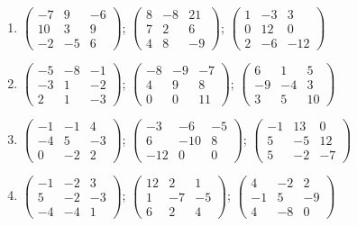 \begin{enumerate}[label=\arabic*., leftmargin=*, itemsep=1pt]
\item $\left(\begin{smallmatrix}-7 & 9 & -6\\ 10 & 3 & 9\\ -2 & -5 & 6\end{smallmatrix}\right)$; $\left(\begin{smallmatrix}8 & -8 & 21\\ 7 & 2 & 6\\ 4 & 8 & -9\end{smallmatrix}\right)$; $\left(\begin{smallmatrix}1 & -3 & 3\\ 0 & 12 & 0\\ 2 & -6 & -12\end{smallmatrix}\right)$
\item $\left(\begin{smallmatrix}-5 & -8 & -1\\ -3 & 1 & -2\\ 2 & 1 & -3\end{smallmatrix}\right)$; $\left(\begin{smallmatrix}-8 & -9 & -7\\ 4 & 9 & 8\\ 0 & 0 & 11\end{smallmatrix}\right)$; $\left(\begin{smallmatrix}6 & 1 & 5\\ -9 & -4 & 3\\ 3 & 5 & 10\end{smallmatrix}\right)$
\item $\left(\begin{smallmatrix}-1 & -1 & 4\\ -4 & 5 & -3\\ 0 & -2 & 2\end{smallmatrix}\right)$; $\left(\begin{smallmatrix}-3 & -6 & -5\\ 6 & -10 & 8\\ -12 & 0 & 0\end{smallmatrix}\right)$; $\left(\begin{smallmatrix}-1 & 13 & 0\\ 5 & -5 & 12\\ 5 & -2 & -7\end{smallmatrix}\right)$
\item $\left(\begin{smallmatrix}-1 & -2 & 3\\ 5 & -2 & -3\\ -4 & -4 & 1\end{smallmatrix}\right)$; $\left(\begin{smallmatrix}12 & 2 & 1\\ 1 & -7 & -5\\ 6 & 2 & 4\end{smallmatrix}\right)$; $\left(\begin{smallmatrix}4 & -2 & 2\\ -1 & 5 & -9\\ 4 & -8 & 0\end{smallmatrix}\right)$

\end{enumerate}
